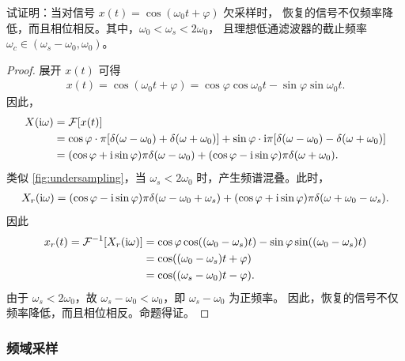 \begin{exercise}
    试证明：当对信号 $x(t) = \cos(\omega_0 t + \varphi)$ 欠采样时，
    恢复的信号不仅频率降低，而且相位相反。其中，$\omega_0 < \omega_s < 2\omega_0$，
    且理想低通滤波器的截止频率 $\omega_c \in (\omega_s - \omega_0, \omega_0)$。
\end{exercise}

\begin{proof}
    展开 $x(t)$ 可得
    \begin{align*}
        x(t) = \cos(\omega_0 t + \varphi) = \cos\varphi\cos\omega_0 t- \sin\varphi \sin\omega_0 t.
    \end{align*}
    因此，
    \begin{align*}
        X(\mathrm{i}\omega) & = \mathcal{F}[x(t)] \\
        & = \cos\varphi\cdot \pi[\delta(\omega - \omega_0) + \delta(\omega + \omega_0)]
            + \sin\varphi\cdot \mathrm{i}\pi[\delta(\omega - \omega_0) - \delta(\omega + \omega_0)] \\
        & = (\cos\varphi + \mathrm{i}\sin\varphi)\pi\delta(\omega - \omega_0)
            + (\cos\varphi - \mathrm{i}\sin\varphi)\pi\delta(\omega + \omega_0).
    \end{align*}
    类似 \ref{fig:undersampling}，当 $\omega_s < 2\omega_0$ 时，产生频谱混叠。此时，
    \begin{align*}
        X_r(\mathrm{i}\omega) = (\cos\varphi - \mathrm{i}\sin\varphi)\pi\delta(\omega - \omega_0 + \omega_s)
            + (\cos\varphi + \mathrm{i}\sin\varphi)\pi\delta(\omega + \omega_0 - \omega_s).
    \end{align*}
    因此
    \begin{align*}
        x_r(t) = \mathcal{F}^{-1}[X_r(\mathrm{i}\omega)] & = \cos\varphi\cos((\omega_0 - \omega_s)t)
            - \sin\varphi\sin((\omega_0 - \omega_s)t) \\
        & = \cos((\omega_0 - \omega_s)t + \varphi) \\
        & = \cos((\omega_s - \omega_0)t - \varphi).
    \end{align*}
    由于 $\omega_s < 2\omega_0$，故 $\omega_s - \omega_0 < \omega_0$，即 $\omega_s - \omega_0$ 为正频率。
    因此，恢复的信号不仅频率降低，而且相位相反。命题得证。
\end{proof}

\subsubsection{频域采样}

